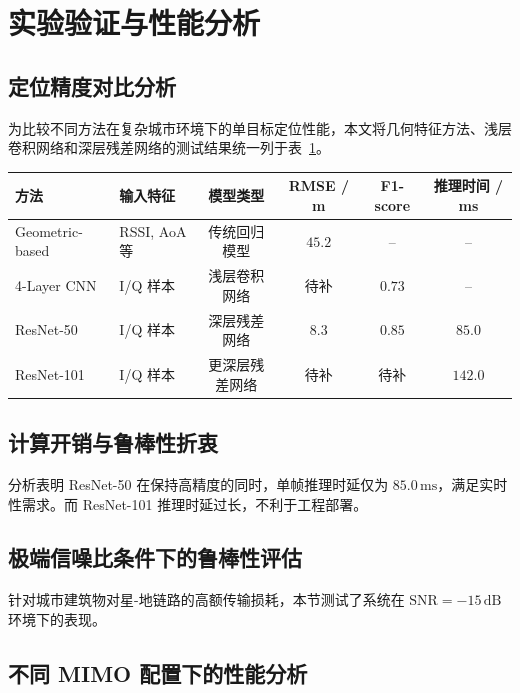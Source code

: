 \section{实验验证与性能分析}

\subsection{定位精度对比分析}

为比较不同方法在复杂城市环境下的单目标定位性能，本文将几何特征方法、浅层卷积网络和深层残差网络的测试结果统一列于表~\ref{tab:perf_comparison_ch3}。

\begin{table}[htbp]
    \centering
    \label{tab:perf_comparison_ch3}
    \begin{tabular}{@{}llcccc@{}}
        \toprule
        \textbf{方法} & \textbf{输入特征} & \textbf{模型类型} & \textbf{RMSE / m} & \textbf{F1-score} & \textbf{推理时间 / ms} \\ \midrule
        Geometric-based & RSSI, AoA 等 & 传统回归模型 & $45.2$ & -- & -- \\
        4-Layer CNN & I/Q 样本 & 浅层卷积网络 & 待补 & $0.73$ & -- \\
        ResNet-50 & I/Q 样本 & 深层残差网络 & $\mathbf{8.3}$ & $\mathbf{0.85}$ & $\mathbf{85.0}$ \\
        ResNet-101 & I/Q 样本 & 更深层残差网络 & 待补 & 待补 & $142.0$ \\ \bottomrule
    \end{tabular}
\end{table}

\subsection{计算开销与鲁棒性折衷}

分析表明 ResNet-50 在保持高精度的同时，单帧推理时延仅为 $85.0\,\text{ms}$，满足实时性需求。而 ResNet-101 推理时延过长，不利于工程部署。

\subsection{极端信噪比条件下的鲁棒性评估}

针对城市建筑物对星-地链路的高额传输损耗，本节测试了系统在 $\text{SNR} = -15\,\text{dB}$ 环境下的表现。

\subsection{不同 MIMO 配置下的性能分析}

